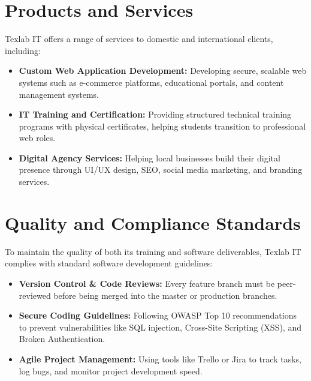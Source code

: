\section{Products and Services}
Texlab IT offers a range of services to domestic and international clients, including:
\begin{itemize}
    \item \textbf{Custom Web Application Development:} Developing secure, scalable web systems such as e-commerce platforms, educational portals, and content management systems.
    \item \textbf{IT Training and Certification:} Providing structured technical training programs with physical certificates, helping students transition to professional web roles.
    \item \textbf{Digital Agency Services:} Helping local businesses build their digital presence through UI/UX design, SEO, social media marketing, and branding services.
\end{itemize}

\section{Quality and Compliance Standards}
To maintain the quality of both its training and software deliverables, Texlab IT complies with standard software development guidelines:
\begin{itemize}
    \item \textbf{Version Control & Code Reviews:} Every feature branch must be peer-reviewed before being merged into the master or production branches.
    \item \textbf{Secure Coding Guidelines:} Following OWASP Top 10 recommendations to prevent vulnerabilities like SQL injection, Cross-Site Scripting (XSS), and Broken Authentication.
    \item \textbf{Agile Project Management:} Using tools like Trello or Jira to track tasks, log bugs, and monitor project development speed.
\end{itemize}

